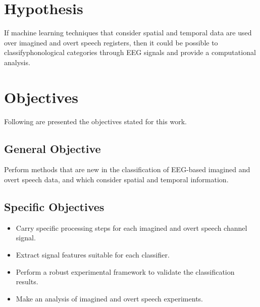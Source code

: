 \section{Hypothesis}
If machine learning techniques that consider spatial and temporal data are used over imagined and overt speech registers, then it could be possible to classify\linebreak[4] phonological categories through EEG signals and provide a computational analysis.
\section{Objectives}
Following are presented the objectives stated for this work.
\subsection{General Objective}
Perform methods that are new in the classification of EEG-based imagined and overt speech data, and which consider spatial and temporal information.
\subsection{Specific Objectives}
\begin{itemize}
	\item Carry specific processing steps for each imagined and overt speech channel signal.
	\item Extract signal features suitable for each classifier.
	\item Perform a robust experimental framework to validate the classification results.
	\item Make an analysis of imagined and overt speech experiments.
\end{itemize}